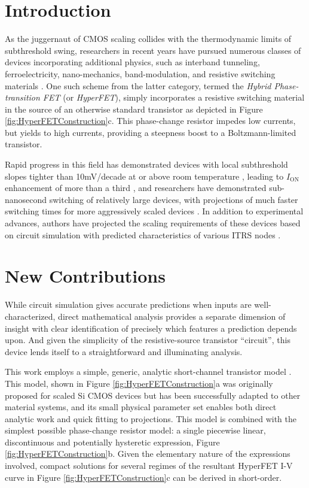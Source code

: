 \ifdoublecol\begin{multicols}{2}\fi

\section*{Introduction}
As the juggernaut of CMOS scaling collides with the thermodynamic limits of subthreshold swing, researchers in recent years have pursued numerous classes of devices incorporating additional physics, such as interband tunneling, ferroelectricity, nano-mechanics, band-modulation, and resistive switching materials \cite{Cristoloveanu_2016}.  One such scheme from the latter category, termed the \textit{Hybrid Phase-transition FET} (or \textit{HyperFET}), simply incorporates a resistive switching material in the source of an otherwise standard transistor \cite{Shukla_2015} as depicted in Figure \ref{fig:HyperFETConstruction}c.  This phase-change resistor impedes low currents, but yields to high currents, providing a steepness boost to a Boltzmann-limited transistor.

Rapid progress in this field has demonstrated devices with local subthreshold slopes tighter than 10mV/decade at or above room temperature \cite{Frougier_2016,Verma_2016}, leading to $I_\mathrm{ON}$ enhancement of more than a third \cite{Frougier_2016}, and researchers have demonstrated sub-nanosecond switching \cite{Frougier_2016,Jerry_2016} of relatively large devices, with projections of much faster switching times for more aggressively scaled devices \cite{Jerry_2016}.  In addition to experimental advances, authors have projected the scaling requirements of these devices based on circuit simulation with predicted characteristics of various ITRS nodes \cite{Shukla_2015,Frougier_2016}. 

\section*{New Contributions}
While circuit simulation gives accurate predictions when inputs are well-characterized, direct mathematical analysis provides a separate dimension of insight with clear identification of precisely which features a prediction depends upon. And given the simplicity of the resistive-source transistor ``circuit'', this device lends itself to a straightforward and illuminating analysis.

This work employs a simple, generic, analytic short-channel transistor model \cite{Khakifirooz_2009}.  This model, shown in Figure \ref{fig:HyperFETConstruction}a was originally proposed for scaled Si CMOS devices but has been successfully adapted to other material systems, and its small physical parameter set enables both direct analytic work and quick fitting to projections.  This model is combined with the simplest possible phase-change resistor model: a single piecewise linear, discontinuous and potentially hysteretic expression, Figure \ref{fig:HyperFETConstruction}b.  Given the elementary nature of the expressions involved, compact solutions for several regimes of the resultant HyperFET I-V curve in Figure \ref{fig:HyperFETConstruction}c can be derived in short-order.


\end{multicols}
